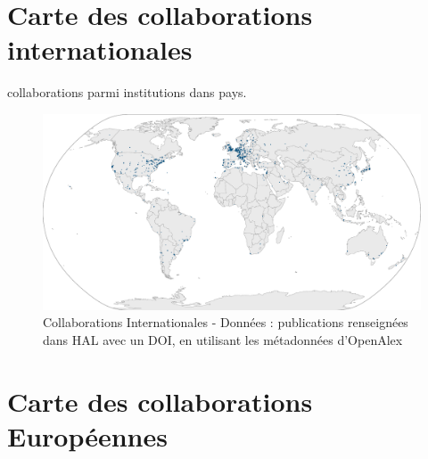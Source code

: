 \documentclass[french, 11pt]{dibiso/biso}
\begin{document}
{
  \footnotesize
  
}

{\footnotesize\journalsinfo}

 
 
 
 
 

\pagebreak

\section{Carte des collaborations internationales}

{\collaborationsnb} collaborations parmi {\institutionsnb} institutions dans {\countriesnb} pays.

\begin{figure}[!h]
  \hspace{-.1\textwidth}\includegraphics[width=1.2\textwidth]{figures/collaboration_map_world.pdf}
  \caption{Collaborations Internationales - Données : publications renseignées dans HAL avec un DOI, en utilisant les métadonnées d'OpenAlex}
  \label{fig_collab_map}
\end{figure}

{\footnotesize\collaborationmapworldinfo}

\pagebreak

\section{Carte des collaborations Européennes}
\end{document}
